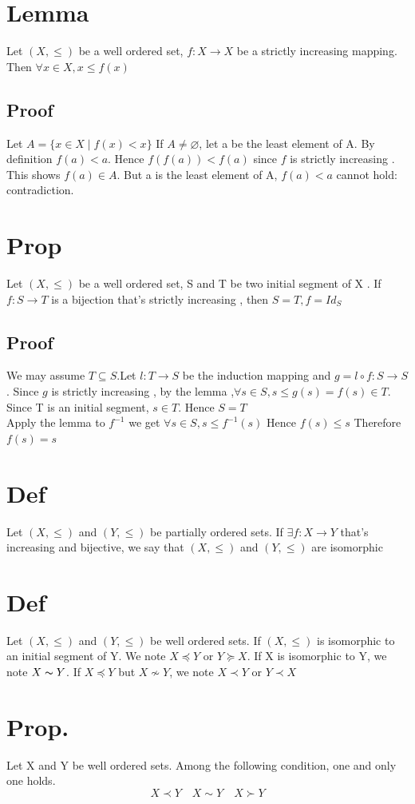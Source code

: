 \documentclass{book}
\begin{document}
\section{Lemma}
Let $(X,\leq)$ be a well ordered set, $f:X\rightarrow X$ be a strictly increasing mapping. Then $\forall x\in X, x\leq f(x)$
\subsection*{Proof}
Let $A=\{x\in X\mid f(x)<x\}$ If $A\not=\varnothing$, let a be the least element of A. By definition $f(a)<a$. Hence $f(f(a))<f(a)$ since $f$ is strictly increasing . This shows $f(a)\in A$. But a is the least element of A, $f(a)<a$ cannot hold: contradiction.
\section{Prop}
Let $(X,\leq)$ be a well ordered set, S and T be two initial segment of X . If $f:S\rightarrow T$ is a bijection that's strictly increasing , then $S=T,f=Id_S$
\subsection*{Proof}
We may assume $T\subseteq S$.Let $l:T\rightarrow S$ be the induction mapping and $g=l\circ f: S\rightarrow S$. Since $g$ is strictly increasing , by the lemma ,$ \forall s\in S,s\leq g(s)=f(s)\in T$. Since T is an initial segment, $s\in T.$ Hence $S=T$ \\Apply the lemma to $f^{-1}$ we get $\forall s\in S, s\leq f^{-1}(s)$ Hence $f(s)\leq s$ Therefore $f(s)=s$
\section{Def}
Let $(X,\leq)$ and $(Y,\leq)$ be partially ordered sets. If  $\exists f: X\rightarrow Y $ that's increasing and bijective, we say that $(X,\leq)$ and $(Y,\leq)$ are isomorphic
\section{Def}
Let $(X,\leq)$ and $(Y,\leq)$ be well ordered sets. If $(X,\leq)$ is isomorphic to an initial segment of Y. We note $X\preceq Y$ or $Y\succeq X$. If X is isomorphic to Y, we note $X\thicksim Y$. If $X\preceq Y$ but $X\not\sim Y$, we note $X\prec Y$ or $Y\prec X$
\section{Prop.}
Let X and Y be well ordered sets. Among the following condition, one and only one holds.$$X\prec Y\quad X\sim Y\quad X\succ Y$$
\end{document}
